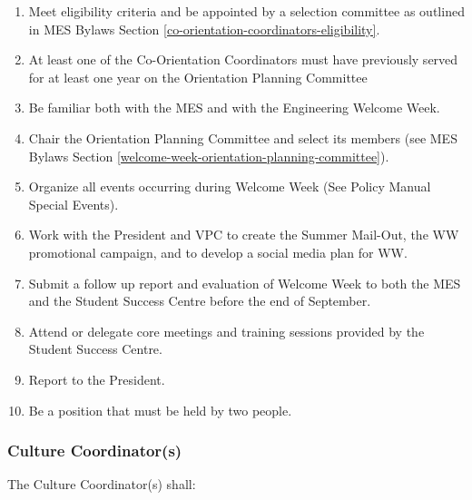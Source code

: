 \begin{enumerate}
 \item
  Meet eligibility criteria and be appointed by a selection committee as outlined in MES Bylaws Section \ref{co-orientation-coordinators-eligibility}.
 \item
  At least one of the Co-Orientation Coordinators must have previously served for at least one year on the Orientation Planning Committee
 \item
  Be familiar both with the MES and with the Engineering Welcome Week.
 \item
  Chair the Orientation Planning Committee and select its members (see MES Bylaws Section \ref{welcome-week-orientation-planning-committee}).
 \item
  Organize all events occurring during Welcome Week (See Policy Manual Special Events). %
 \item
  Work with the President and VPC to create the Summer Mail-Out, the WW promotional campaign, and to develop a social media plan for WW.
 \item
  Submit a follow up report and evaluation of Welcome Week to both the MES and the Student Success Centre before the end of September.
 \item
  Attend or delegate core meetings and training sessions provided by the Student Success Centre.
 \item
  Report to the President.
 \item
  Be a position that must be held by two people.
\end{enumerate}

\subsubsection{Culture Coordinator(s)}
\label{culture-coordinators}
The Culture Coordinator(s) shall:

